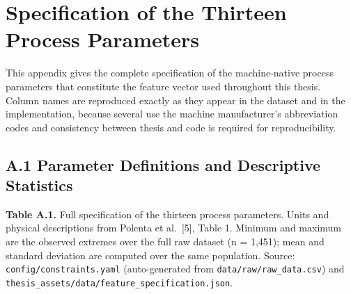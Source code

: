\hypertarget{specification-of-the-thirteen-process-parameters}{%
\chapter{Specification of the Thirteen Process Parameters}\label{specification-of-the-thirteen-process-parameters}}

This appendix gives the complete specification of the machine-native process parameters that constitute the feature vector used throughout this thesis. Column names are reproduced exactly as they appear in the dataset and in the implementation, because several use the machine manufacturer's abbreviation codes and consistency between thesis and code is required for reproducibility.

\hypertarget{a.1-parameter-definitions-and-descriptive-statistics}{%
\section{A.1 Parameter Definitions and Descriptive Statistics}\label{a.1-parameter-definitions-and-descriptive-statistics}}

\textbf{Table A.1.} Full specification of the thirteen process parameters. Units and physical descriptions from Polenta et al.~{[}5{]}, Table 1. Minimum and maximum are the observed extremes over the full raw dataset (n = 1,451); mean and standard deviation are computed over the same population. Source: \texttt{config/constraints.yaml} (auto-generated from \texttt{data/raw/raw\_data.csv}) and \texttt{thesis\_assets/data/feature\_specification.json}.

